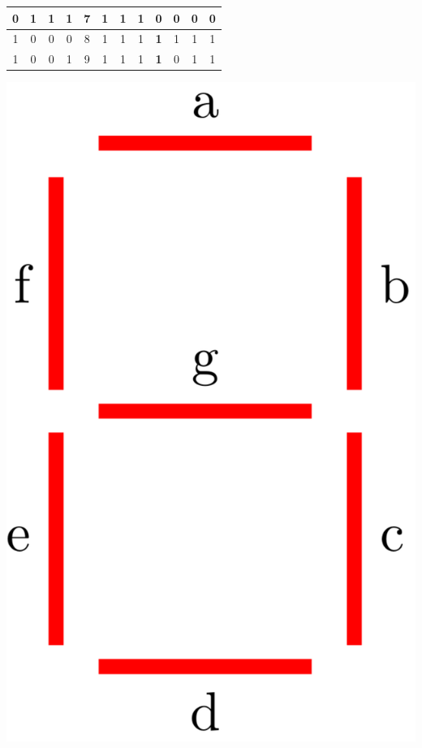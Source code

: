 \documentclass[10pt, oneside]{article}
\begin{document}
\begin{minipage}{0.69\linewidth}
\begin{tabular}{|c|c|c|c|c|c|c|c|c|c|c|c|}
        \hline
        0     & 1     & 1     & 1     & 7       & 1          & 1          & 1          & \textbf{0}        & 0          & 0          & 0          \\
        \hline
        1     & 0     & 0     & 0     & 8       & 1          & 1          & 1          & \textbf{1}        & 1          & 1          & 1          \\
        \hline
        1     & 0     & 0     & 1     & 9       & 1          & 1          & 1          & \textbf{1}        & 0          & 1          & 1          \\
        \hline
    \end{tabular}
    \egroup
\end{minipage} 
\hfill
\begin{minipage}{0.29\linewidth}
    \centering
    \includegraphics[width=0.85\linewidth]{./assets/7s.png}
    \vfill
\end{minipage}
\end{document}

